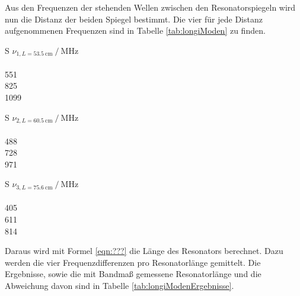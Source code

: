 Aus den Frequenzen der stehenden Wellen zwischen den Resonatorspiegeln wird nun die Distanz der beiden Spiegel bestimmt. Die vier für jede Distanz aufgenommenen Frequenzen sind in Tabelle \ref{tab:longiModen} zu finden.
\begin{table}
  \centering
  \begin{tabular}{S}
    \toprule
    {$\nu_{1, L = \SI{53.5}{\centi\meter}}\:/\:\si{\mega\hertz}$}\\
    \\
551\\
825\\
1099\\
    \bottomrule
  \end{tabular}
  \begin{tabular}{S}
    \toprule
    {$\nu_{2, L = \SI{60.5}{\centi\meter}}\:/\:\si{\mega\hertz}$}\\
    \\
488\\
728\\
971\\
    \bottomrule
  \end{tabular}
  \begin{tabular}{S}
    \toprule
    {$\nu_{3, L = \SI{75.6}{\centi\meter}}\:/\:\si{\mega\hertz}$}\\
    \\
405\\
611\\
814\\
    \bottomrule
  \end{tabular}
  \caption{Messwerte der Frequenzmessung bei unterschiedlichen Resonatorlängen. Als Fehler der Frequenzmessung wird $\sigma_{\nu} = \SI{5}{\mega\hertz}$ angenommen.}
  \label{tab:longiModen}
\end{table}

Daraus wird mit Formel \eqref{eqn:???} die Länge des Resonators berechnet. Dazu werden die vier Frequenzdifferenzen pro Resonatorlänge gemittelt. Die Ergebnisse, sowie die mit Bandmaß gemessene Resonatorlänge und die Abweichung davon sind in Tabelle \ref{tab:longiModenErgebnisse}.


